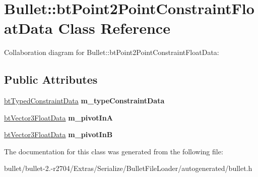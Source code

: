 \hypertarget{class_bullet_1_1bt_point2_point_constraint_float_data}{\section{Bullet\+:\+:bt\+Point2\+Point\+Constraint\+Float\+Data Class Reference}
\label{class_bullet_1_1bt_point2_point_constraint_float_data}
}


Collaboration diagram for Bullet\+:\+:bt\+Point2\+Point\+Constraint\+Float\+Data\+:
\subsection*{Public Attributes}
\begin{DoxyCompactItemize}
\item 
\hypertarget{class_bullet_1_1bt_point2_point_constraint_float_data_a16cace35454850482ca1678d63d95f60}{\hyperlink{class_bullet_1_1bt_typed_constraint_data}{bt\+Typed\+Constraint\+Data} {\bfseries m\+\_\+type\+Constraint\+Data}}\label{class_bullet_1_1bt_point2_point_constraint_float_data_a16cace35454850482ca1678d63d95f60}

\item 
\hypertarget{class_bullet_1_1bt_point2_point_constraint_float_data_a9b693a69c352c333e996974181b92089}{\hyperlink{class_bullet_1_1bt_vector3_float_data}{bt\+Vector3\+Float\+Data} {\bfseries m\+\_\+pivot\+In\+A}}\label{class_bullet_1_1bt_point2_point_constraint_float_data_a9b693a69c352c333e996974181b92089}

\item 
\hypertarget{class_bullet_1_1bt_point2_point_constraint_float_data_aebdcce45b5b32256c80b46167f8b3ce2}{\hyperlink{class_bullet_1_1bt_vector3_float_data}{bt\+Vector3\+Float\+Data} {\bfseries m\+\_\+pivot\+In\+B}}\label{class_bullet_1_1bt_point2_point_constraint_float_data_aebdcce45b5b32256c80b46167f8b3ce2}

\end{DoxyCompactItemize}


The documentation for this class was generated from the following file\+:\begin{DoxyCompactItemize}
\item 
bullet/bullet-\/2.-\/r2704/\+Extras/\+Serialize/\+Bullet\+File\+Loader/autogenerated/bullet.\+h\end{DoxyCompactItemize}
